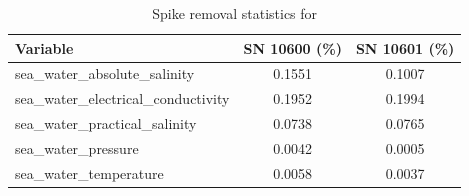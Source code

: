 \begin{table}[h]
\centering
\caption{Spike removal statistics for \projectname{} \casenumber{}}
\label{tab:str18_spike_stats}
\begin{tabular}{|l|c|c|}
\hline
Variable & SN 10600 (\%) & SN 10601 (\%) \\
\hline
sea\_water\_absolute\_salinity & 0.1551 & 0.1007 \\
sea\_water\_electrical\_conductivity & 0.1952 & 0.1994 \\
sea\_water\_practical\_salinity & 0.0738 & 0.0765 \\
sea\_water\_pressure & 0.0042 & 0.0005 \\
sea\_water\_temperature & 0.0058 & 0.0037 \\
\hline
\end{tabular}
\end{table}
